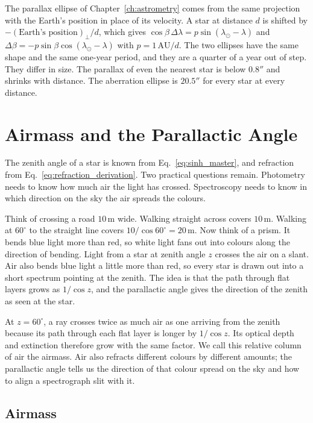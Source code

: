 The parallax ellipse of Chapter~\ref{ch:astrometry} comes from the same projection with the Earth's position in place of its velocity. A star at distance $d$ is shifted by $-(\text{Earth's position})_\perp/d$, which gives $\cos\beta\,\Delta\lambda=p\sin(\lambda_\odot-\lambda)$ and $\Delta\beta=-p\sin\beta\cos(\lambda_\odot-\lambda)$ with $p=1\,\mathrm{AU}/d$. The two ellipses have the same shape and the same one-year period, and they are a quarter of a year out of step. They differ in size. The parallax of even the nearest star is below $0.8''$ and shrinks with distance. The aberration ellipse is $20.5''$ for every star at every distance.

\section{Airmass and the Parallactic Angle}
\label{co:sec:airmass}

The zenith angle of a star is known from Eq.~\eqref{eq:sinh_master}, and refraction from Eq.~\eqref{eq:refraction_derivation}. Two practical questions remain. Photometry needs to know how much air the light has crossed. Spectroscopy needs to know in which direction on the sky the air spreads the colours.

Think of crossing a road $10\,\mathrm m$ wide. Walking straight across covers $10\,\mathrm m$. Walking at $60^\circ$ to the straight line covers $10/\cos60^\circ=20\,\mathrm m$. Now think of a prism. It bends blue light more than red, so white light fans out into colours along the direction of bending. Light from a star at zenith angle $z$ crosses the air on a slant. Air also bends blue light a little more than red, so every star is drawn out into a short spectrum pointing at the zenith. The idea is that the path through flat layers grows as $1/\cos z$, and the parallactic angle gives the direction of the zenith as seen at the star.

At $z=60^\circ$, a ray crosses twice as much air as one arriving from the zenith because its path through each flat layer is longer by $1/\cos z$. Its optical depth and extinction therefore grow with the same factor. We call this relative column of air the airmass. Air also refracts different colours by different amounts; the parallactic angle tells us the direction of that colour spread on the sky and how to align a spectrograph slit with it.

\subsection{Airmass}


